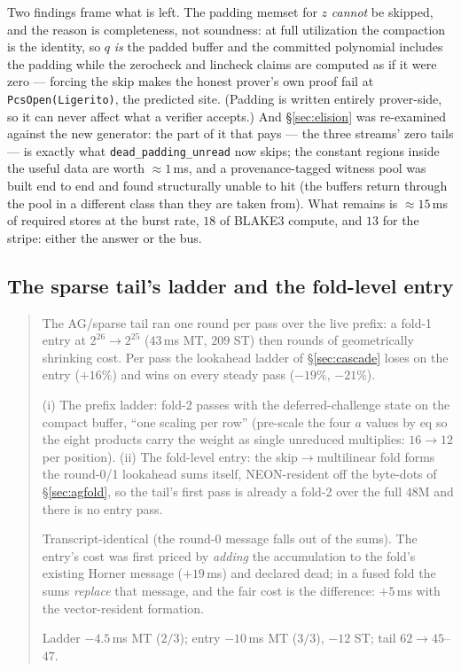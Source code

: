 \documentclass[11pt]{article}
\newcommand{\code}[1]{\texttt{#1}}
\newenvironment{optsummary}{%
  \begin{quote}\small
  \begin{description}
  \setlength{\itemsep}{1pt}\setlength{\parsep}{0pt}\setlength{\topsep}{2pt}
}{%
  \end{description}
  \end{quote}
}
\begin{document}
Two findings frame what is left. The padding memset for $z$
\emph{cannot} be skipped, and the reason is completeness, not
soundness: at full utilization the compaction is the identity, so $q$
\emph{is} the padded buffer and the committed polynomial includes the
padding while the zerocheck and lincheck claims are computed as if it
were zero --- forcing the skip makes the honest prover's own proof fail
at \code{PcsOpen(Ligerito)}, the predicted site. (Padding is written
entirely prover-side, so it can never affect what a verifier accepts.)
And \S\ref{sec:elision} was re-examined against the new generator: the
part of it that pays --- the three streams' zero tails --- is exactly
what \code{dead\_padding\_unread} now skips; the constant regions inside
the useful data are worth $\approx1\,$ms, and a provenance-tagged
witness pool was built end to end and found structurally unable to hit
(the buffers return through the pool in a different class than they are
taken from). What remains is $\approx15\,$ms of required stores at the
burst rate, $18$ of BLAKE3 compute, and $13$ for the stripe: either the
answer or the bus.

\subsection{The sparse tail's ladder and the fold-level entry}\label{sec:foldentry}

\begin{optsummary}
\item[Baseline:] The AG/sparse tail ran one round per pass over the live prefix: a fold-1 entry at $2^{26}\to2^{25}$ ($43\,$ms MT, $209$ ST) then rounds of geometrically shrinking cost. Per pass the lookahead ladder of \S\ref{sec:cascade} loses on the entry ($+16\%$) and wins on every steady pass ($-19\%$, $-21\%$).
\item[Improvement:] (i) The prefix ladder: fold-2 passes with the deferred-challenge state on the compact buffer, ``one scaling per row'' (pre-scale the four $a$ values by eq so the eight products carry the weight as single unreduced multiplies: $16\to12$ per position). (ii) The fold-level entry: the skip$\to$multilinear fold forms the round-0/1 lookahead sums itself, NEON-resident off the byte-dots of \S\ref{sec:agfold}, so the tail's first pass is already a fold-2 over the full $48$M and there is no entry pass.
\item[Mechanism:] Transcript-identical (the round-0 message falls out of the sums). The entry's cost was first priced by \emph{adding} the accumulation to the fold's existing Horner message ($+19\,$ms) and declared dead; in a fused fold the sums \emph{replace} that message, and the fair cost is the difference: $+5\,$ms with the vector-resident formation.
\item[Result:] Ladder $-4.5\,$ms MT ($2/3$); entry $-10\,$ms MT ($3/3$), $-12$ ST; tail $62\to45$--$47$.
\end{optsummary}
\end{document}
